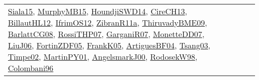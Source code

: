 {\begin{longtable}{lp{3cm}>{\raggedright}p{6cm}>{\raggedright}p{6cm}p{8cm}}
\href{articles/Siala15.pdf}{Siala15}\cite{Siala15}, \href{papers/MurphyMB15.pdf}{MurphyMB15}\cite{MurphyMB15}, \href{papers/HoundjiSWD14.pdf}{HoundjiSWD14}\cite{HoundjiSWD14}, \href{papers/CireCH13.pdf}{CireCH13}\cite{CireCH13}, \href{papers/BillautHL12.pdf}{BillautHL12}\cite{BillautHL12}, \href{papers/IfrimOS12.pdf}{IfrimOS12}\cite{IfrimOS12}, \href{papers/ZibranR11a.pdf}{ZibranR11a}\cite{ZibranR11a}, \href{papers/ThiruvadyBME09.pdf}{ThiruvadyBME09}\cite{ThiruvadyBME09}, \href{papers/BarlattCG08.pdf}{BarlattCG08}\cite{BarlattCG08}, \href{papers/RossiTHP07.pdf}{RossiTHP07}\cite{RossiTHP07}, \href{papers/GarganiR07.pdf}{GarganiR07}\cite{GarganiR07}, \href{papers/MonetteDD07.pdf}{MonetteDD07}\cite{MonetteDD07}, \href{papers/LiuJ06.pdf}{LiuJ06}\cite{LiuJ06}, \href{papers/FortinZDF05.pdf}{FortinZDF05}\cite{FortinZDF05}, \href{papers/FrankK05.pdf}{FrankK05}\cite{FrankK05}, \href{papers/ArtiguesBF04.pdf}{ArtiguesBF04}\cite{ArtiguesBF04}, \href{articles/Tsang03.pdf}{Tsang03}\cite{Tsang03}, \href{articles/Timpe02.pdf}{Timpe02}\cite{Timpe02}, \href{articles/MartinPY01.pdf}{MartinPY01}\cite{MartinPY01}, \href{papers/AngelsmarkJ00.pdf}{AngelsmarkJ00}\cite{AngelsmarkJ00}, \href{papers/RodosekW98.pdf}{RodosekW98}\cite{RodosekW98}, \href{papers/Colombani96.pdf}{Colombani96}\cite{Colombani96}\\

\end{longtable}}
